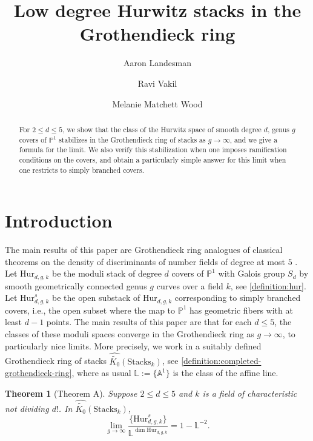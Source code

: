 \documentclass[12 pt]{amsart}
\title{Low degree Hurwitz stacks in the Grothendieck ring}
\author{Aaron Landesman}
\author{Ravi Vakil}
\author{Melanie Matchett Wood}
\newcommand{\rboxed}[1]{#1}
\theoremstyle{plain}
\newtheorem{theorem}[subsection]{Theorem}
\theoremstyle{definition}
\theoremstyle{remark}
\numberwithin{equation}{section}
\newcommand\ba{\mathbb A}
\newcommand\bl{\mathbb L}
\newcommand\bp{\mathbb P}
\newcommand\hur[3]{\mathrm{Hur}_{#1,#2,#3}} %
\newcommand\rhur[4]{\mathrm{Hur}_{#1,#2,#3}^{#4}} %
\newcommand\grcSpaces{\widehat{\widetilde{K_0}}(\mathrm{Spaces}_k)} %
\newcommand\grcStacks{\widehat{\widetilde{K_0}}(\mathrm{Stacks}_k)} %
\begin{document}
\maketitle
\begin{abstract}
	For $2 \leq d \leq 5$, we show that the class of the Hurwitz
	space of smooth degree $d$, genus $g$
	covers of $\mathbb P^1$
	stabilizes in the Grothendieck ring of stacks
	as $g \to \infty$, and we give a formula for the limit.
	We also verify this stabilization when one imposes ramification
	conditions on the covers, and obtain a particularly simple answer for this limit
	when one restricts to simply branched covers.
\end{abstract}




\section{Introduction}

The main results of this paper are Grothendieck ring analogues of 
classical theorems on the density of
discriminants of number fields of degree at most $5$
\cite{Davenport1969,Bhargava2005,Bhargava2010a}.
Let $\rboxed{\hur d g k}$  be the moduli stack of degree $d$
covers 
of $\bp^1$ with Galois group $S_d$ by smooth geometrically connected
genus $g$
curves over a field $k$,  see \autoref{definition:hur}. Let $\rhur d g k s$ be the
open substack of $\hur d g k$ corresponding to simply branched covers, i.e.,
the open subset where the map to $\bp^1$ has geometric fibers with at least $d-1$ points.  
The main results of this paper are that for each $d \leq 5$, the classes of
these moduli
spaces converge  in the Grothendieck ring as $g \rightarrow \infty$, to
particularly nice limits.
More precisely, we work in a suitably defined
Grothendieck ring of stacks $\grcStacks$, see
\autoref{definition:completed-grothendieck-ring}, where as usual
$\rboxed{\bl} := \{\ba^1\}$
is the class of the affine line.

\begin{theorem}[Theorem A]  \label{t:A}
	Suppose $2 \leq d \leq 5$
	and $k$ is a
	field of
	characteristic not dividing $d!$. In
$\grcStacks$, $$ \lim_{g \rightarrow \infty}  \frac {\{\rhur d g k s\}}
{\bl^{ \dim \hur d g k}} = 1 - \bl^{-2}.  $$  \end{theorem}
\end{document}
